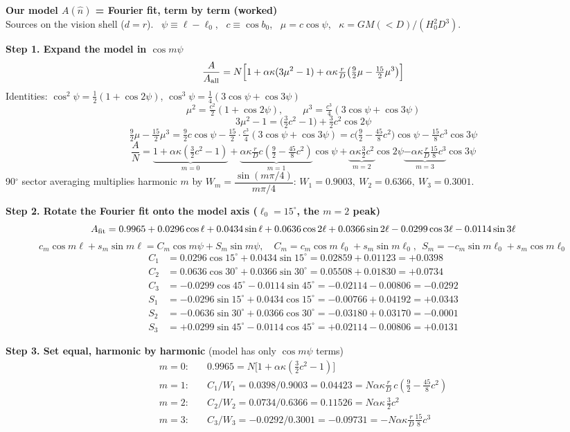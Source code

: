 \documentclass[11pt]{article}
\begin{document}
\textbf{\large Our model $A(\hat n)$ = Fourier fit, term by term (worked)}\\[3pt]
Sources on the vision shell ($d=r$). \ $\psi\equiv\ell-\ell_0$, \ $c\equiv\cos b_0$, \ $\mu=c\cos\psi$, \ $\kappa=GM(<D)/(H_0^2D^3)$.

\medskip\textbf{Step 1. Expand the model in $\cos m\psi$}
\[
\frac{A}{A_{\rm all}}=N\Big[1+\alpha\kappa(3\mu^2-1)+\alpha\kappa\tfrac{r}{D}\big(\tfrac92\mu-\tfrac{15}{2}\mu^3\big)\Big]
\]
Identities: \quad $\cos^2\psi=\tfrac12(1+\cos2\psi)$, \qquad $\cos^3\psi=\tfrac14(3\cos\psi+\cos3\psi)$
\[
\mu^2=\tfrac{c^2}{2}(1+\cos2\psi),\qquad \mu^3=\tfrac{c^3}{4}(3\cos\psi+\cos3\psi)
\]
\[
3\mu^2-1=\big(\tfrac32c^2-1\big)+\tfrac32c^2\cos2\psi
\]
\[
\tfrac92\mu-\tfrac{15}{2}\mu^3=\tfrac92c\cos\psi-\tfrac{15}{2}\cdot\tfrac{c^3}{4}(3\cos\psi+\cos3\psi)
=c\big(\tfrac92-\tfrac{45}{8}c^2\big)\cos\psi-\tfrac{15}{8}c^3\cos3\psi
\]
\[
\frac{A}{N}=\underbrace{1+\alpha\kappa(\tfrac32c^2-1)}_{m=0}
+\underbrace{\alpha\kappa\tfrac rD c(\tfrac92-\tfrac{45}{8}c^2)}_{m=1}\cos\psi
+\underbrace{\alpha\kappa\tfrac32c^2}_{m=2}\cos2\psi
\underbrace{-\alpha\kappa\tfrac rD\tfrac{15}{8}c^3}_{m=3}\cos3\psi
\]
90$^\circ$ sector averaging multiplies harmonic $m$ by
$W_m=\dfrac{\sin(m\pi/4)}{m\pi/4}$: \quad $W_1=0.9003,\ W_2=0.6366,\ W_3=0.3001$.

\medskip\textbf{Step 2. Rotate the Fourier fit onto the model axis ($\ell_0=15^\circ$, the $m{=}2$ peak)}
\[
A_{\rm fit}=0.9965+0.0296\cos\ell+0.0434\sin\ell+0.0636\cos2\ell+0.0366\sin2\ell-0.0299\cos3\ell-0.0114\sin3\ell
\]
\[
c_m\cos m\ell+s_m\sin m\ell=C_m\cos m\psi+S_m\sin m\psi,\quad
C_m=c_m\cos m\ell_0+s_m\sin m\ell_0,\ \ S_m=-c_m\sin m\ell_0+s_m\cos m\ell_0
\]
\begin{align*}
C_1&=0.0296\cos15^\circ+0.0434\sin15^\circ=0.02859+0.01123=+0.0398\\
C_2&=0.0636\cos30^\circ+0.0366\sin30^\circ=0.05508+0.01830=+0.0734\\
C_3&=-0.0299\cos45^\circ-0.0114\sin45^\circ=-0.02114-0.00806=-0.0292\\[3pt]
S_1&=-0.0296\sin15^\circ+0.0434\cos15^\circ=-0.00766+0.04192=+0.0343\\
S_2&=-0.0636\sin30^\circ+0.0366\cos30^\circ=-0.03180+0.03170=-0.0001\\
S_3&=+0.0299\sin45^\circ-0.0114\cos45^\circ=+0.02114-0.00806=+0.0131
\end{align*}

\medskip\textbf{Step 3. Set equal, harmonic by harmonic} (model has only $\cos m\psi$ terms)
\begin{align*}
m=0:&\quad 0.9965=N\big[1+\alpha\kappa(\tfrac32c^2-1)\big]\\
m=1:&\quad C_1/W_1=0.0398/0.9003=0.04423=N\alpha\kappa\tfrac rD\,c(\tfrac92-\tfrac{45}{8}c^2)\\
m=2:&\quad C_2/W_2=0.0734/0.6366=0.11526=N\alpha\kappa\,\tfrac32c^2\\
m=3:&\quad C_3/W_3=-0.0292/0.3001=-0.09731=-N\alpha\kappa\tfrac rD\tfrac{15}{8}c^3
\end{align*}
\end{document}
